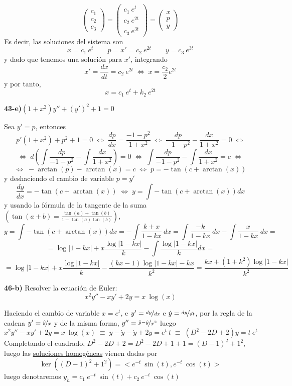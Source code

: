\begin{enumerate}
\begin{sol}
$$\begin{pmatrix}
        c_1 \\ c_2 \\ c_3
    \end{pmatrix}=  \begin{pmatrix}
        c_1 \: e^{t}  \\ c_2 \: e^{2t} \\ c_3 \: e^{3t} 
    \end{pmatrix} =\begin{pmatrix}
        x \\ p \\ y 
    \end{pmatrix}$$
    Es decir, las soluciones del sistema son 
    $$x=c_1 \: e^{t}  \qquad   p = x' = c_2 \: e^{2t} \qquad y = c_3 \: e^{3t} $$
    y dado que tenemos una solución para $x'$, integrando
    $$x'=\dfrac{dx}{dt}=c_2 \: e^{2t} \; \iff \; x=\dfrac{c_2}{2} e^{2t}$$
    y por tanto, 
    $$x=c_1 \: e^{t} + k_2 \: e^{2t}$$
\end{sol}
\textbf{43-e)}$(1+x^2)y''+(y')^2+1=0$
\begin{sol}
    Sea $y'=p$, entonces
    $$p'(1+x^2)+p^2+1=0 \; \iff \; \dfrac{dp}{dx}=\dfrac{-1-p^2}{1+x^2} \; \iff \; \dfrac{dp}{-1-p^2}-\dfrac{dx}{1+x^2}=0 \; \iff $$
    $$\iff \; d\left(\int \dfrac{dp}{-1-p^2} - \int \dfrac{dx}{1+x^2} \right)=0 \; \iff \; \int \dfrac{dp}{-1-p^2} - \int \dfrac{dx}{1+x^2} = c \; \iff $$
    $$ \iff \; -\arctan(p)-\arctan(x)=c \; \iff \; p=-\tan (c+\arctan(x))$$
    y deshaciendo el cambio de variable $p=y'$
    $$\dfrac{dy}{dx}=-\tan (c+\arctan(x)) \; \iff \; y=\int -\tan (c+\arctan(x)) dx$$
    y usando la fórmula de la tangente de la suma $\left(\tan(a+b)=\frac{\tan(a)+\tan(b)}{1-\tan(a)\tan(b)}\right)$,
    $$y=\int -\tan (c+\arctan(x)) dx=-\int \dfrac{k+x}{1-kx} \: dx = \int \dfrac{-k}{1-kx} \: dx  - \int \dfrac{x}{1-kx} \: dx = $$
    $$=\log|1-kx| + x \dfrac{\log|1-kx|}{k} - \int \dfrac{\log|1-kx|}{k} dx =$$
    $$=\log|1-kx| + x \dfrac{\log|1-kx|}{k} - \dfrac{( k x-1 ) \log|1 - k x| - kx}{k^2} = \dfrac{k x + (1 + k^2) \log|1 - k x|}{k^2} $$  
\end{sol}

\textbf{46-b)} Resolver la ecuación de Euler:
$$x^2y''-xy'+2y=x \: \log(x)$$
\begin{sol}
    Haciendo el cambio de variable $x=e^t$, e $y'=\nicefrac{dy}{dx}$ e $\dot{y}=\nicefrac{dy}{dt}$, por la regla de la cadena $y'=\nicefrac{\dot{y}}{x}$ y de la misma forma, $y''=\nicefrac{\ddot{y}-\dot{y}}{x^2}$ luego
    $$x^2y''-xy'+2y=x \: \log(x) \; \equiv \; \ddot{y}-\dot{y}-\dot{y}+2y=e^t \: t \; \equiv \; (D^2-2D+2)y=t \: e^t$$
    Completando el cuadrado, $D^2-2D+2=D^2-2D+1+1=(D-1)^2+1^2$, luego las \underline{soluciones homogéneas} vienen dadas por 
    $$\ker((D-1)^2+1^2)=<e^{-t} \: \sin(t), e^{-t} \: \cos (t)>$$
    luego denotaremos  $y_h=c_1 \: e^{-t} \: \sin(t) + c_2 \: e^{-t} \: \cos (t)$
    

\end{sol}
\end{enumerate}

